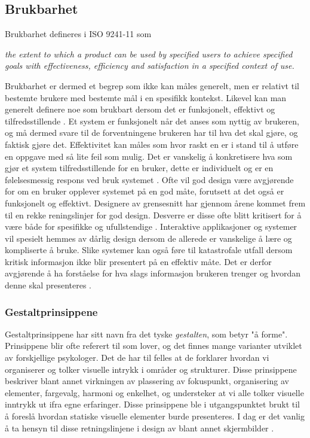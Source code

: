 \subsection{Brukbarhet}
\label{chp: brukbarhet}

Brukbarhet defineres i ISO 9241-11 \cite{Svanes08} som

\noindent
\begin{otherlanguage}{english}
\emph{the extent to which a product can be used by specified users to achieve specified goals with effectiveness, efficiency and satisfaction in a specified context of use.}
\end{otherlanguage}

\noindent
Brukbarhet er dermed et begrep som ikke kan måles generelt, men er relativt til bestemte brukere med bestemte mål i en spesifikk kontekst. Likevel kan man generelt definere noe som brukbart dersom det er funksjonelt, effektivt og tilfredsstillende \cite{Kuniavsky}. Et system er funksjonelt når det anses som nyttig av brukeren, og må dermed svare til de forventningene brukeren har til hva det skal gjøre, og faktisk gjøre det. Effektivitet kan måles som hvor raskt en er i stand til å utføre en oppgave med så lite feil som mulig. Det er vanskelig å konkretisere hva som gjør et system tilfredsstillende for en bruker, dette er individuelt og er en følelsesmessig respons ved bruk systemet \cite{Kuniavsky}. Ofte vil god design være avgjørende for om en bruker opplever systemet på en god måte, forutsett at det også er funksjonelt og effektivt. Designere av grensesnitt har gjennom årene kommet frem til en rekke reningslinjer for god design. Desverre er disse ofte blitt kritisert for å være både for spesifikke og ufullstendige \cite{mmi}. 
Interaktive applikasjoner og systemer vil spesielt hemmes av dårlig design dersom de allerede er vanskelige å lære og kompliserte å bruke. Slike systemer kan også føre til katastrofale utfall dersom kritisk informasjon ikke blir presentert på en effektiv måte. Det er derfor avgjørende å ha forståelse for hva slags informasjon brukeren trenger og hvordan denne skal presenteres \cite{Ebright10}. 

\subsubsection{Gestaltprinsippene}
Gestaltprinsippene har sitt navn fra det tyske \emph{gestalten}, som betyr "å forme". Prinsippene blir ofte referert til som lover, og det finnes mange varianter utviklet av forskjellige psykologer. Det de har til felles at de forklarer hvordan vi organiserer og tolker visuelle intrykk i områder og strukturer. Disse prinsippene beskriver blant annet virkningen av plassering av fokuspunkt, organisering av elementer, fargevalg, harmoni og enkelhet, og understeker at vi alle tolker visuelle inntrykk ut ifra egne erfaringer. 
Disse prinsippene ble i utgangspunktet brukt til å foreslå hvordan statiske visuelle elementer burde presenteres. I dag er det vanlig å ta hensyn til disse retningslinjene i design av blant annet skjermbilder \cite{Chang02}. 


